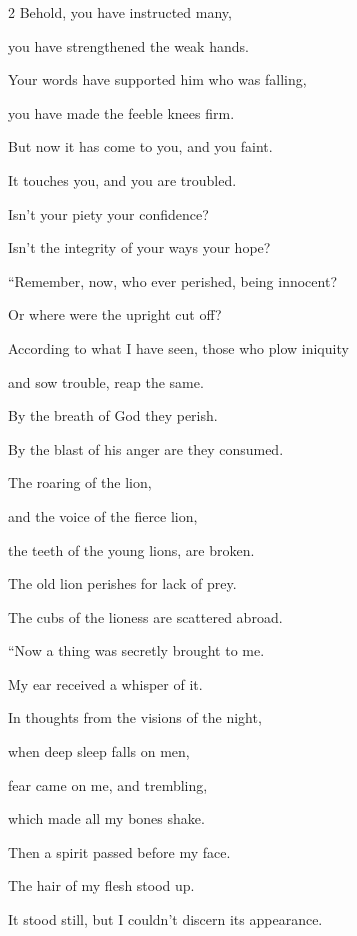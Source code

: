 \begin{multicols}{2}
	\myverse{}Behold, you have instructed many,
	
	you have strengthened the weak hands.
	
	\myverse{}Your words have supported him who was falling,
	
	you have made the feeble knees firm.
	
	\myverse{}But now it has come to you, and you faint.
	
	It touches you, and you are troubled.
	
	\myverse{}Isn’t your piety your confidence?
	
	Isn’t the integrity of your ways your hope?
	
	\vspace{\baselineskip}
	
	\myverse{}“Remember, now, who ever perished, being innocent?
	
	Or where were the upright cut off?
	
	\myverse{}According to what I have seen, those who plow iniquity
	
	and sow trouble, reap the same.
	
	\myverse{}By the breath of God they perish.
	
	By the blast of his anger are they consumed.
	
	\myverse{}The roaring of the lion,
	
	and the voice of the fierce lion,
	
	the teeth of the young lions, are broken.
	
	\myverse{}The old lion perishes for lack of prey.
	
	The cubs of the lioness are scattered abroad.
	
	\vspace{\baselineskip}
	
	\myverse{}“Now a thing was secretly brought to me.
	
	My ear received a whisper of it.
	
	\myverse{}In thoughts from the visions of the night,
	
	when deep sleep falls on men,
	
	\myverse{}fear came on me, and trembling,
	
	which made all my bones shake.
	
	\myverse{}Then a spirit passed before my face.
	
	The hair of my flesh stood up.
	
	\myverse{}It stood still, but I couldn’t discern its appearance.
	

\end{multicols}
